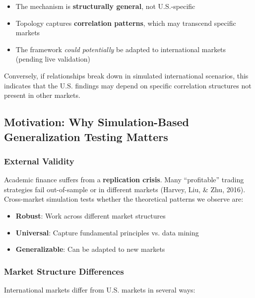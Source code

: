 \begin{itemize}
\item The mechanism is \textbf{structurally general}, not U.S.-specific
\item Topology captures \textbf{correlation patterns}, which may transcend specific markets
\item The framework \textit{could potentially} be adapted to international markets (pending live validation)
\end{itemize}

Conversely, if relationships break down in simulated international scenarios, this indicates that the U.S. findings may depend on specific correlation structures not present in other markets.

\subsection{Motivation: Why Simulation-Based Generalization Testing Matters}

\subsubsection{External Validity}

Academic finance suffers from a \textbf{replication crisis}. Many ``profitable'' trading strategies fail out-of-sample or in different markets (Harvey, Liu, \& Zhu, 2016). Cross-market simulation tests whether the theoretical patterns we observe are:

\begin{itemize}
\item \textbf{Robust}: Work across different market structures
\item \textbf{Universal}: Capture fundamental principles vs. data mining
\item \textbf{Generalizable}: Can be adapted to new markets
\end{itemize}

\subsubsection{Market Structure Differences}

International markets differ from U.S. markets in several ways:

